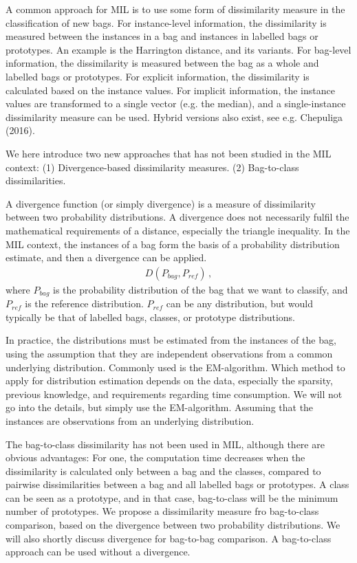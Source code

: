 A common approach for MIL is to use some form of dissimilarity measure in the classification of new bags. 
For instance-level information, the dissimilarity is measured between the instances in a bag and instances in labelled bags or prototypes. 
An example is the Harrington distance, and its variants. 
For bag-level information, the dissimilarity is measured between the bag as a whole and labelled bags or prototypes. 
For explicit information, the dissimilarity is calculated based on the instance values.
For implicit information, the instance values are transformed to a single vector (e.g. the median), and a single-instance dissimilarity measure can be used. 
Hybrid versions also exist, see e.g. {\color{green} Chepuliga (2016)}. 

We here introduce two new approaches that has not been studied in the MIL context: 
(1) Divergence-based dissimilarity measures. 
(2) Bag-to-class dissimilarities. 

A divergence function (or simply divergence) is a measure of dissimilarity between two probability distributions.
A divergence does not necessarily fulfil the mathematical requirements of a distance, especially the triangle inequality. 
In the MIL context, the instances of a bag form the basis of a probability distribution estimate, and then a divergence can be applied. \\
\begin{align}
  D(P_{bag}, P_{ref})\, ,
\end{align}
where $P_{bag}$ is the probability distribution of the bag that we want to classify, and $P_{ref}$ is the reference distribution. 
$P_{ref}$ can be any distribution, but would typically be that of labelled bags, classes, or prototype distributions. 

In practice, the distributions must be estimated from the instances of the bag, using the assumption that they are independent observations from a common underlying distribution. 
Commonly used is the EM-algorithm.
Which method to apply for distribution estimation depends on the data, especially the sparsity, previous knowledge, and requirements regarding time consumption. 
We will not go into the details, but simply use the EM-algorithm.
Assuming that the instances are observations from an underlying distribution. 

The bag-to-class dissimilarity has not been used in MIL, although there are obvious advantages:
For one, the computation time decreases when the dissimilarity is calculated only between a bag and the classes, compared to pairwise dissimilarities between a bag and all labelled bags or prototypes. 
A class can be seen as a prototype, and in that case, bag-to-class will be the minimum number of prototypes. 
We propose a dissimilarity measure fro bag-to-class comparison, based on the divergence between two probability distributions. 
We will also shortly discuss divergence for bag-to-bag comparison. 
A bag-to-class approach can be used without a divergence. 

